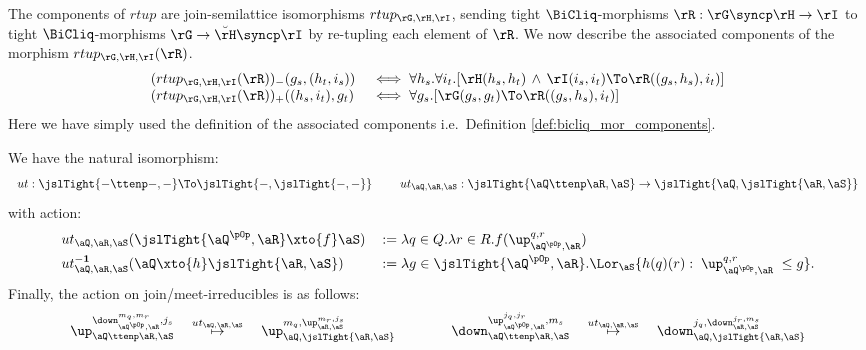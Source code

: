 \documentclass{article}
\begin{document}
\begin{note}
\label{note:rtup_component_assoc}
\item
The components of $rtup$ are join-semilattice isomorphisms $rtup_{\rG,\rH,\rI}$, sending tight $\BiCliq$-morphisms $\rR : \rG \syncp \rH \to \rI$ to tight $\BiCliq$-morphisms $\rG \to \breve{\rH} \syncp \rI$ by re-tupling each element of $\rR$. We now describe the associated components of the morphism $rtup_{\rG,\rH,\rI}(\rR)$.
\[
\begin{tabular}{ll}
$(rtup_{\rG,\rH,\rI}(\rR))_-(g_s,(h_t,i_s))$
&
$\iff \forall h_s.\forall i_t.[ \rH(h_s,h_t) \,\land\, \rI(i_s,i_t) \To \rR((g_s,h_s),i_t) ]$
\\
$(rtup_{\rG,\rH,\rI}(\rR))_+((h_s,i_t),g_t)$
&
$\iff \forall g_s.[\rG(g_s,g_t) \To \rR((g_s,h_s),i_t)]$
\end{tabular}
\]
Here we have simply used the definition of the associated components i.e.\ Definition \ref{def:bicliq_mor_components}. \endbox
\end{note}


\bigskip



\begin{theorem}
\item
We have the natural isomorphism:
\[
\begin{tabular}{c}
$ut : \jslTight{- \ttenp -, -} \To \jslTight{-,\jslTight{-,-}}$
\qquad
$ut_{\aQ,\aR,\aS} : \jslTight{\aQ \ttenp \aR,\aS} \to \jslTight{\aQ,\jslTight{\aR,\aS}}$
\end{tabular}
\]
with action:
\[
\begin{tabular}{lll}
$ut_{\aQ,\aR,\aS}(\jslTight{\aQ^{\pOp},\aR} \xto{f} \aS)$
& $ := \lambda q \in Q. \lambda r \in R.f(\up_{\aQ^{\pOp},\aR}^{q,r})$
\\[1ex]
$ut_{\aQ,\aR,\aS}^{\bf-1}(\aQ \xto{h} \jslTight{\aR,\aS})$
& $ := \lambda g \in \jslTight{\aQ^{\pOp},\aR}. \Lor_\aS \{ h(q)(r) : \; \up_{\aQ^{\pOp},\aR}^{q,r} \; \leq g \}$.
\end{tabular}
\]
Finally, the action on join/meet-irreducibles is as follows:
\[
\up_{\aQ \ttenp \aR, \aS}^{\down_{\aQ^{\pOp},\aR}^{m_q,m_r}, j_s}
\quad \stackrel{ut_{\aQ,\aR,\aS}}{\mapsto} \quad
\up_{\aQ,\jslTight{\aR,\aS}}^{m_q, \up_{\aR,\aS}^{m_r,j_s} }
\qquad\qquad
\down_{\aQ \ttenp \aR, \aS}^{\up_{\aQ^{\pOp},\aR}^{j_q,j_r}, m_s}
\quad \stackrel{ut_{\aQ,\aR,\aS}}{\mapsto} \quad
\down_{\aQ,\jslTight{\aR,\aS}}^{j_q, \down_{\aR,\aS}^{j_r,m_s} }
\]
\end{theorem}
\end{document}
